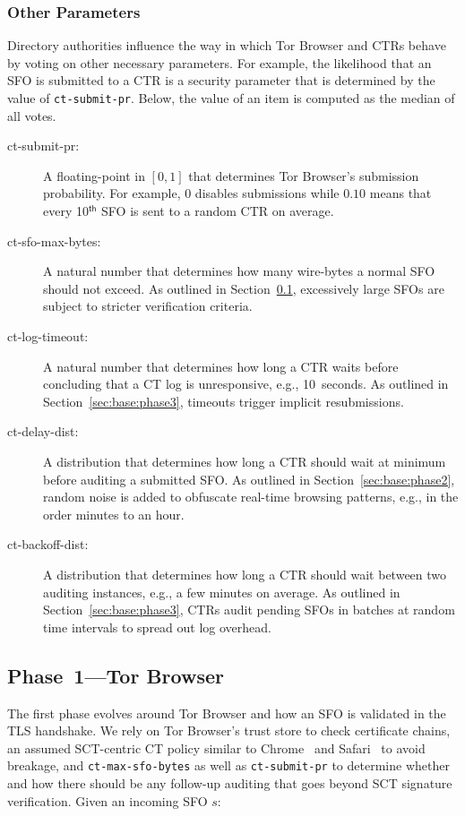\subsubsection{Other Parameters} \label{sec:base:consensus:params}
Directory authorities influence the way in which Tor Browser and CTRs behave by
voting on other necessary parameters.  For example, the likelihood that
an SFO is submitted to a CTR is a security parameter that is determined by the
value of \texttt{ct-submit-pr}.  Below, the value of an item is computed as the
median of all votes.
\begin{description}
	\item[ct-submit-pr:] A floating-point in $[0,1]$ that determines Tor
		Browser's submission probability.  For example, $0$ disables submissions
		while $0.10$ means that every 10$^{\mathsf{th}}$ SFO is sent to a
		random CTR on average.
	\item[ct-sfo-max-bytes:] A natural number that determines how many
		wire-bytes a normal SFO should not exceed.  As outlined in
		Section~\ref{sec:base:phase1}, excessively large SFOs are subject
		to stricter verification criteria.
	\item[ct-log-timeout:] A natural number that determines how long a CTR
		waits before concluding that a CT log is unresponsive, e.g., 10~seconds.
		As outlined in Section~\ref{sec:base:phase3}, timeouts trigger implicit
		resubmissions.
	\item[ct-delay-dist:] A distribution that determines how long a CTR should
		wait at minimum before auditing a submitted SFO.  As outlined in
		Section~\ref{sec:base:phase2}, random noise is added to obfuscate
		real-time browsing patterns, e.g., in the order minutes to an hour.
	\item[ct-backoff-dist:]
		A distribution that determines how long a CTR should wait between two
		auditing instances, e.g., a few minutes on average.  As outlined in
		Section~\ref{sec:base:phase3}, CTRs audit pending SFOs in batches at
		random time intervals to spread out log overhead.
\end{description}

\subsection{Phase~1---Tor Browser} \label{sec:base:phase1}
The first phase evolves around Tor Browser and how an SFO is validated in the
TLS handshake.  We rely on Tor Browser's trust store to check certificate
chains, an assumed SCT-centric CT policy similar to Chrome~\cite{chrome-policy}
and Safari~\cite{safari-policy} to avoid breakage, and \texttt{ct-max-sfo-bytes}
as well as \texttt{ct-submit-pr} to determine whether and how there should be
any follow-up auditing that goes beyond SCT signature verification.  Given an
incoming SFO $s$:

